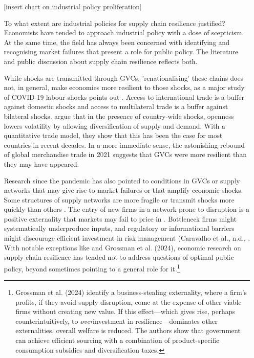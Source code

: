 \documentclass{article}
\begin{document}
[insert chart on industrial policy proliferation]

To what extent are industrial policies for supply chain resilience justified? Economists have tended to approach industrial policy with a dose of scepticism. At the same time, the field has always been concerned with identifying and recognising market failures that present a role for public policy. The literature and public discussion about supply chain resilience reflects both.

While shocks are transmitted through GVCs, 'renationalising' these chains does not, in general, make economies more resilient to those shocks, as a major study of COVID-19 labour shocks points out \parencite{bonadio_global_2021}. Access to international trade is a buffer against domestic shocks and access to multilateral trade is a buffer against bilateral shocks. \textcite{caselli_diversification_2020} argue that in the presence of country-wide shocks, openness lowers volatility by allowing diversification of supply and demand. With a quantitative trade model, they show that this has been the case for most countries in recent decades. In a more immediate sense, the astonishing rebound of global merchandise trade in 2021 suggests that GVCs were more resilient than they may have appeared.

Research since the pandemic has also pointed to conditions in GVCs or supply networks that may give rise to market failures or that amplify economic shocks. Some structures of supply networks are more fragile or transmit shocks more quickly than others \parencite{elliott_networks_2022}. The entry of new firms in a network prone to disruption is a positive externality that markets may fail to price in \parencite{bimpikis_supply_2019}. Bottleneck firms might systematically underproduce inputs, and regulatory or informational barriers might discourage efficient investment in risk management (Caravalho et al., n.d., \parencite{productivity_commission_vulnerable_2021}. With notable exceptions like \textcite{productivity_commission_vulnerable_2021} and Grossman et al. (2024), economic research on supply chain resilience has tended not to address questions of optimal public policy, beyond sometimes pointing to a general role for it.\footnote{Grossman et al. (2024) identify a business-stealing externality, where a firm's profits, if they avoid supply disruption, come at the expense of other viable firms without creating new value. If this effect---which gives rise, perhaps counterintuitively, to \textit{over}investment in resilience---dominates other externalities, overall welfare is reduced. The authors show that government can achieve efficient sourcing with a combination of product-specific consumption subsidies and diversification taxes.}
\end{document}
